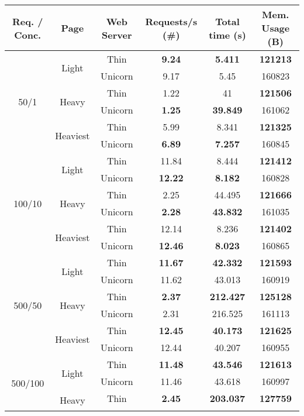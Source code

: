 \begin{table}[ht]
\begin{tabular}{|c|c|c|c|c|c|}
\hline
  Req. / Conc. & Page & Web Server & Requests/s (\#) & Total time (s) & Mem. Usage (B) \\ \hline
\multirow{6}{*}{50/1} & \multirow{2}{*}{Light} & Thin & \textbf{9.24} & \textbf{5.411} & \textbf{121213}\\\cline{3-6}
 &  & Unicorn & 9.17 & 5.45 & 160823\\\cline{2-6}
 & \multirow{2}{*}{Heavy} & Thin & 1.22 & 41 & \textbf{121506}\\\cline{3-6}
 &  & Unicorn & \textbf{1.25} & \textbf{39.849} & 161062\\\cline{2-6}
 & \multirow{2}{*}{Heaviest} & Thin & 5.99 & 8.341 & \textbf{121325}\\\cline{3-6}
 &  & Unicorn & \textbf{6.89} & \textbf{7.257} & 160845\\\hline
\multirow{6}{*}{100/10} & \multirow{2}{*}{Light} & Thin & 11.84 & 8.444 & \textbf{121412}\\\cline{3-6}
 &  & Unicorn & \textbf{12.22} & \textbf{8.182} & 160828\\\cline{2-6}
 & \multirow{2}{*}{Heavy} & Thin & 2.25 & 44.495 & \textbf{121666}\\\cline{3-6}
 &  & Unicorn & \textbf{2.28} & \textbf{43.832} & 161035\\\cline{2-6}
 & \multirow{2}{*}{Heaviest} & Thin & 12.14 & 8.236 & \textbf{121402}\\\cline{3-6}
 &  & Unicorn & \textbf{12.46} & \textbf{8.023} & 160865\\\hline
\multirow{6}{*}{500/50} & \multirow{2}{*}{Light} & Thin & \textbf{11.67} & \textbf{42.332} & \textbf{121593}\\\cline{3-6}
 &  & Unicorn & 11.62 & 43.013 & 160919\\\cline{2-6}
 & \multirow{2}{*}{Heavy} & Thin & \textbf{2.37} & \textbf{212.427} & \textbf{125128}\\\cline{3-6}
 &  & Unicorn & 2.31 & 216.525 & 161113\\\cline{2-6}
 & \multirow{2}{*}{Heaviest} & Thin & \textbf{12.45} & \textbf{40.173} & \textbf{121625}\\\cline{3-6}
 &  & Unicorn & 12.44 & 40.207 & 160955\\\hline
\multirow{6}{*}{500/100} & \multirow{2}{*}{Light} & Thin & \textbf{11.48} & \textbf{43.546} & \textbf{121613}\\\cline{3-6}
 &  & Unicorn & 11.46 & 43.618 & 160997\\\cline{2-6}
 & \multirow{2}{*}{Heavy} & Thin & \textbf{2.45} & \textbf{203.037} & \textbf{127759}\\\cline{3-6}

\end{tabular}
\end{table}
